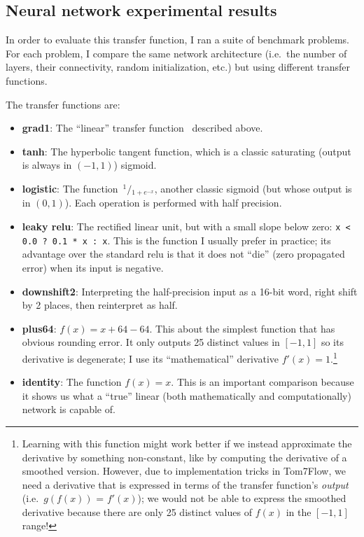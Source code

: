 \documentclass[twocolumn]{article}
\newcommand\sfrac[2]{\!{}\,^{#1}\!/{}\!_{#2}}
\begin{document}
\subsection{Neural network experimental results}
In order to evaluate this transfer function, I ran a suite of
benchmark problems. For each problem, I compare the same network
architecture (i.e.~the number of layers, their connectivity, random
initialization, etc.) but using different transfer functions.

The transfer functions are:

\begin{itemize}
\item {\bf grad1}: The ``linear'' transfer function \gradone\ described above.
\item {\bf tanh}: The hyperbolic tangent function, which is a classic saturating (output is always in $(-1, 1)$) sigmoid.
\item {\bf logistic}: The function $\sfrac{1}{1 + e^{-x}}$, another classic sigmoid (but whose output is in $(0, 1)$). Each operation is performed with half precision.
\item {\bf leaky relu}: The rectified linear unit, but with a small slope below zero: \verb|x < 0.0 ? 0.1 * x : x|. This is the function I usually prefer in practice; its advantage over the standard relu is that it does not ``die'' (zero propagated error) when its input is negative.
\item {\bf downshift2}: Interpreting the half-precision input as a 16-bit word, right shift by 2 places, then reinterpret as half.
\item {\bf plus64}: $f(x) = x + 64 - 64$. This about the simplest function that has obvious rounding error. It only outputs 25 distinct values in $[-1, 1]$ so its derivative is degenerate; I use its ``mathematical'' derivative $f'(x) = 1$.\footnote{Learning with this function might work better if we instead approximate the derivative by something non-constant, like by computing the derivative of a smoothed version. However, due to implementation tricks in Tom7Flow, we need a derivative that is expressed in terms of the transfer function's {\it output} (i.e.~$g(f(x))$ = $f'(x)$); we would not be able to express the smoothed derivative because there are only 25 distinct values of $f(x)$ in the $[-1,1]$ range!}
\item {\bf identity}: The function $f(x) = x$. This is an important comparison because it shows us what a ``true'' linear (both mathematically and computationally) network is capable of.
\end{itemize}
\end{document}
